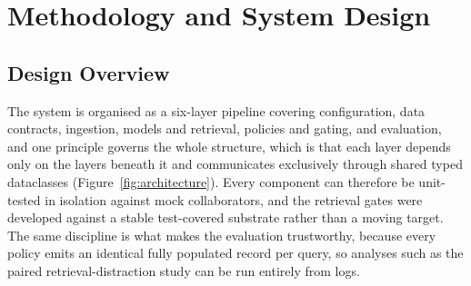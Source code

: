 \chapter{Methodology and System Design}
\label{ch:method}

\section{Design Overview}
\label{sec:method-overview}

The system is organised as a six-layer pipeline covering configuration, data
contracts, ingestion, models and retrieval, policies and gating, and
evaluation, and one principle governs the whole structure, which is that each
layer depends only on the layers beneath it and communicates exclusively
through shared typed dataclasses (Figure~\ref{fig:architecture}). Every
component can therefore be unit-tested in isolation against mock
collaborators, and the retrieval gates were developed against a stable
test-covered substrate rather than a moving target. The same discipline is
what makes the evaluation trustworthy, because every policy emits an
identical fully populated record per query, so analyses such as the paired
retrieval-distraction study can be run entirely from logs.

